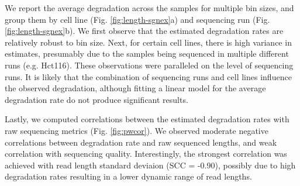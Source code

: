 We report the average degradation across the samples for multiple bin sizes, and group them by cell line (Fig. \ref{fig:length-sgnex}a) and sequencing run (Fig. \ref{fig:length-sgnex}b). We first observe that the estimated degradation rates are relatively robust to bin size. Next, for certain cell lines, there is high variance in estimates, presumably due to the samples being sequenced in multiple different runs (e.g. Hct116). These observations were paralleled on the level of sequencing runs. It is likely that the combination of sequencing runs and cell lines influence the observed degradation, although fitting a linear model for the average degradation rate do not produce significant results.

Lastly, we computed correlations between the estimated degradation rates with raw sequencing metrics (Fig. \ref{fig:pwcor}). We observed moderate negative correlations between degradation rate and raw sequenced lengths, and weak correlation with sequencing quality. Interestingly, the strongest correlation was achieved with read length standard deviaion (SCC = -0.90), possibly due to high degradation rates resulting in a lower dynamic range of read lengths. 

\begin{table}[H]
  \centering
      \caption[Description of SG-NEx samples across cell lines and sequencing runs]{Description of SG-NEx samples across cell lines and sequencing runs}
  \label{tab:six-six}%
\end{table}%

